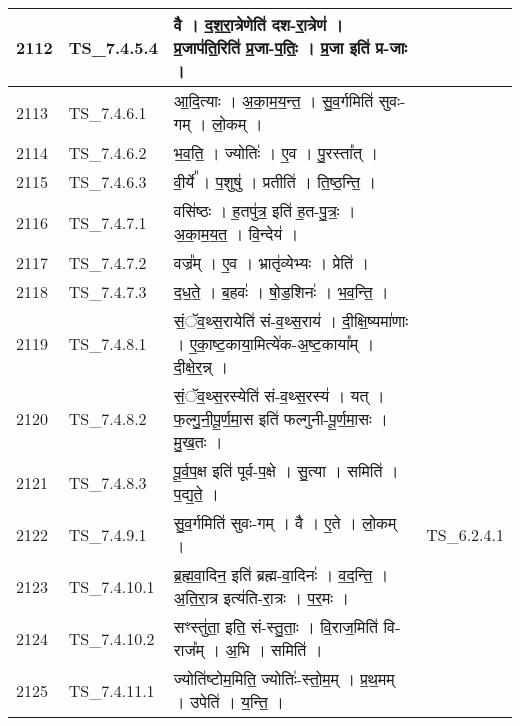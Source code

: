 \documentclass[17pt]{extarticle}
\begin{document}
\begin{longtable}{||p{0.4in}||p{0.9in}||p{4.0in}||p{0.9in}||}
            2112 & TS\_7.4.5.4 & वै   ।   द॒श॒रा॒त्रेणेति॑ दश{-}रा॒त्रेण॑   ।   प्र॒जाप॑ति॒रिति॑ प्र॒जा{-}प॒तिः॒   ।   प्र॒जा इति॑ प्र{-}जाः   ।    &      \\
        \hline
            2113 & TS\_7.4.6.1 & आ॒दि॒त्याः   ।   अ॒का॒म॒य॒न्त॒   ।   सु॒व॒र्गमिति॑ सुवः{-}गम्   ।   लो॒कम्   ।    &      \\
        \hline
            2114 & TS\_7.4.6.2 & भ॒व॒ति॒   ।   ज्योतिः॑   ।   ए॒व   ।   पु॒रस्ता᳚त्   ।    &      \\
        \hline
            2115 & TS\_7.4.6.3 & वी॒र्ये᳚   ।   प॒शुषु॑   ।   प्रतीति॑   ।   ति॒ष्ठ॒न्ति॒   ।    &      \\
        \hline
            2116 & TS\_7.4.7.1 & वसि॑ष्ठः   ।   ह॒तपु॑त्र॒ इति॑ ह॒त{-}पु॒त्रः॒   ।   अ॒का॒म॒य॒त॒   ।   वि॒न्देय॑   ।    &      \\
        \hline
            2117 & TS\_7.4.7.2 & वज्र᳚म्   ।   ए॒व   ।   भ्रातृ॑व्येभ्यः   ।   प्रेति॑   ।    &      \\
        \hline
            2118 & TS\_7.4.7.3 & द॒ध॒ते॒   ।   ब॒हवः॑   ।   षो॒ड॒शिनः॑   ।   भ॒व॒न्ति॒   ।    &      \\
        \hline
            2119 & TS\_7.4.8.1 & सं॒ॅव॒थ्स॒रायेति॑ सं{-}व॒थ्स॒राय॑   ।   दी॒क्षि॒ष्यमा॑णाः   ।   ए॒का॒ष्ट॒काया॒मित्ये॑क{-}अ॒ष्ट॒काया᳚म्   ।   दी॒क्षे॒र॒न्न्   ।    &      \\
        \hline
            2120 & TS\_7.4.8.2 & सं॒ॅव॒थ्स॒रस्येति॑ सं{-}व॒थ्स॒रस्य॑   ।   यत्   ।   फ॒ल्गु॒नी॒पू॒र्ण॒मा॒स इति॑ फल्गुनी{-}पू॒र्ण॒मा॒सः   ।   मु॒ख॒तः   ।    &      \\
        \hline
            2121 & TS\_7.4.8.3 & पू॒र्व॒प॒क्ष इति॑ पूर्व{-}प॒क्षे   ।   सु॒त्या   ।   समिति॑   ।   प॒द्य॒ते॒   ।    &      \\
        \hline
            2122 & TS\_7.4.9.1 & सु॒व॒र्गमिति॑ सुवः{-}गम्   ।   वै   ।   ए॒ते   ।   लो॒कम्   ।    & TS\_6.2.4.1        \\
        \hline
            2123 & TS\_7.4.10.1 & ब्र॒ह्म॒वा॒दिन॒ इति॑ ब्रह्म{-}वा॒दिनः॑   ।   व॒द॒न्ति॒   ।   अ॒ति॒रा॒त्र इत्य॑ति{-}रा॒त्रः   ।   प॒र॒मः   ।    &      \\
        \hline
            2124 & TS\_7.4.10.2 & सꣳस्तु॑ता॒ इति॒ सं{-}स्तु॒ताः॒   ।   वि॒राज॒मिति॑ वि{-}राज᳚म्   ।   अ॒भि   ।   समिति॑   ।    &      \\
        \hline
            2125 & TS\_7.4.11.1 & ज्योति॑ष्टोम॒मिति॒ ज्योतिः॑{-}स्तो॒म॒म्   ।   प्र॒थ॒मम्   ।   उपेति॑   ।   य॒न्ति॒   ।    &      \\
        \hline

\end{longtable}
\end{document}
